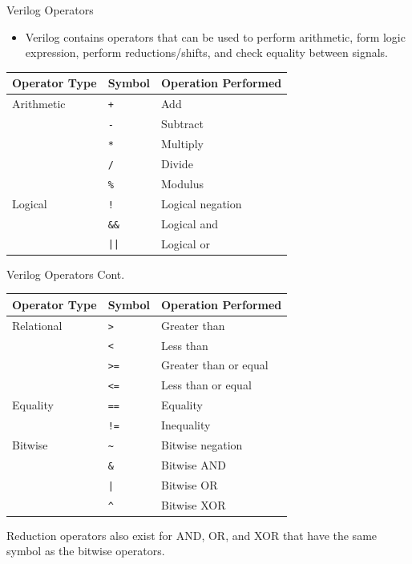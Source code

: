 \documentclass{beamer}
\begin{document}
\begin{frame}[fragile]{Verilog Operators}
	\begin{itemize}
		\item Verilog contains operators that can be used to perform arithmetic, form logic expression, perform reductions/shifts, and check equality between signals.
	\end{itemize}
	\begin{center}
	\begin{tabular}{l | l | l}
		Operator Type & Symbol & Operation Performed \\ \hline
		Arithmetic & \texttt{+} & Add \\ \hline
		& \texttt{-} & Subtract \\ \hline
		& \texttt{*} & Multiply \\ \hline
		& \texttt{/} & Divide \\ \hline
		& \texttt{\%} & Modulus \\ \hline
		Logical & \texttt{!} & Logical negation \\ \hline
		& \texttt{\&\&} & Logical and \\ \hline
		& \texttt{||} & Logical or \\ \hline
	\end{tabular}
	\end{center}
\end{frame}

\begin{frame}[fragile]{Verilog Operators Cont.}
	\begin{center}
		\begin{tabular}{l | l | l}
			Operator Type & Symbol & Operation Performed \\ \hline
			Relational & \texttt{>} & Greater than \\ \hline
			& \texttt{<} & Less than \\ \hline
			& \texttt{>=} & Greater than or equal \\ \hline
			& \texttt{<=} & Less than or equal \\ \hline
			Equality & \texttt{==} & Equality \\ \hline
			& \texttt{!=} & Inequality \\ \hline
			Bitwise & \texttt{\~} & Bitwise negation \\ \hline
			& \texttt{\&} & Bitwise AND \\ \hline
			& \texttt{|} & Bitwise OR \\ \hline
			& \texttt{\^} & Bitwise XOR \\ \hline
		\end{tabular}
	\end{center}
	Reduction operators also exist for AND, OR, and XOR that have the same symbol as the bitwise operators.
\end{frame}
\end{document}
